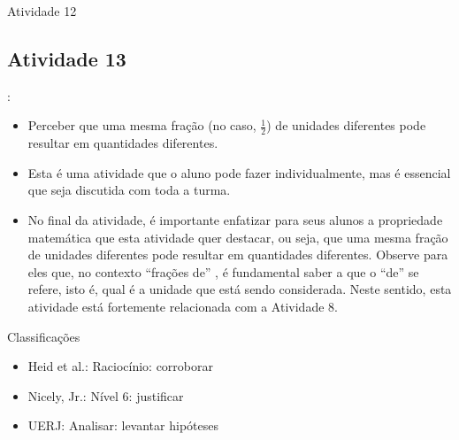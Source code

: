 \documentclass[oneside]{book}
\begin{document}
\begin{multicols}{2}
\begin{resposta*}{Atividade 12}
\end{resposta*}



\subsection{Atividade 13}





  \vspace{.1cm}:

  \begin{itemize} %
    \item       Perceber que uma mesma fração (no caso, $\frac{1}{2}$) de unidades diferentes pode resultar em quantidades diferentes.
\end{itemize} %


  \vspace{.1cm} 
  
  \vspace{.1cm}

  \begin{itemize} %
    \item       Esta é uma atividade que o aluno pode fazer individualmente, mas é essencial que seja discutida com toda a turma.
    \item       No final da atividade, é importante enfatizar para seus alunos a propriedade matemática que esta atividade quer destacar, ou seja, que uma mesma fração de unidades diferentes pode resultar em quantidades diferentes. Observe para eles que, no contexto       ``frações de''      , é fundamental saber a que o       ``de''       se refere, isto é, qual é a unidade que está sendo considerada. Neste sentido, esta atividade está fortemente relacionada com a Atividade 8.
\end{itemize} %


  Classificações
\begin{itemize} %
    \item       Heid et al.: Raciocínio: corroborar
    \item       Nicely, Jr.: Nível 6: justificar
    \item       UERJ: Analisar: levantar hipóteses
\end{itemize} %



\end{multicols}
\end{document}

